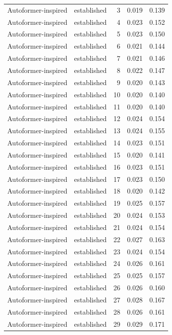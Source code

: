 \begin{tabular}{llrrr}
Autoformer-inspired & established & 3 & 0.019 & 0.139 \\
Autoformer-inspired & established & 4 & 0.023 & 0.152 \\
Autoformer-inspired & established & 5 & 0.023 & 0.150 \\
Autoformer-inspired & established & 6 & 0.021 & 0.144 \\
Autoformer-inspired & established & 7 & 0.021 & 0.146 \\
Autoformer-inspired & established & 8 & 0.022 & 0.147 \\
Autoformer-inspired & established & 9 & 0.020 & 0.143 \\
Autoformer-inspired & established & 10 & 0.020 & 0.140 \\
Autoformer-inspired & established & 11 & 0.020 & 0.140 \\
Autoformer-inspired & established & 12 & 0.024 & 0.154 \\
Autoformer-inspired & established & 13 & 0.024 & 0.155 \\
Autoformer-inspired & established & 14 & 0.023 & 0.151 \\
Autoformer-inspired & established & 15 & 0.020 & 0.141 \\
Autoformer-inspired & established & 16 & 0.023 & 0.151 \\
Autoformer-inspired & established & 17 & 0.023 & 0.150 \\
Autoformer-inspired & established & 18 & 0.020 & 0.142 \\
Autoformer-inspired & established & 19 & 0.025 & 0.157 \\
Autoformer-inspired & established & 20 & 0.024 & 0.153 \\
Autoformer-inspired & established & 21 & 0.024 & 0.154 \\
Autoformer-inspired & established & 22 & 0.027 & 0.163 \\
Autoformer-inspired & established & 23 & 0.024 & 0.154 \\
Autoformer-inspired & established & 24 & 0.026 & 0.161 \\
Autoformer-inspired & established & 25 & 0.025 & 0.157 \\
Autoformer-inspired & established & 26 & 0.026 & 0.160 \\
Autoformer-inspired & established & 27 & 0.028 & 0.167 \\
Autoformer-inspired & established & 28 & 0.026 & 0.161 \\
Autoformer-inspired & established & 29 & 0.029 & 0.171 \\

\end{tabular}
